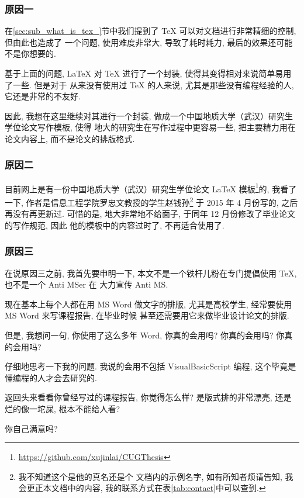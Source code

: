 \documentclass[doctor]{cugthesis}
\begin{document}
\subsubsection{原因一}
    在\ref{sec:sub_what_is_tex_}节中我们提到了 \TeX{} 可以对文档进行非常精细的控制, 但由此也造成了
    一个问题, 使用难度非常大, 导致了耗时耗力, 最后的效果还可能不是你想要的. 

    基于上面的问题, \LaTeX{} 对 \TeX{} 进行了一个封装, 使得其变得相对来说简单易用了一些. 但是对于
    从来没有使用过 \TeX{} 的人来说, 尤其是那些没有编程经验的人, 它还是非常的不友好. 

    因此, 我想在这里继续对其进行一个封装, 做成一个中国地质大学（武汉）研究生学位论文写作模板, 使得
    地大的研究生在写作过程中更容易一些, 把主要精力用在论文内容上, 而不是论文的排版格式. 

\subsubsection{原因二}
    目前网上是有一份中国地质大学（武汉）研究生学位论文 \LaTeX{} 模板\footnote{\url{https://github.com/xujinlai/CUGThesis}}的, 
    我看了一下, 作者是信息工程学院罗忠文教授的学生赵钱孙\footnote{我不知道这个是他的真名还是个
    文档内的示例名字, 如有所知者烦请告知, 我会更正本文档中的内容, 我的联系方式在表\ref{tab:contact}中可以查到. }
    于 2015 年 4 月份写的, 之后再没有再更新过. 可惜的是, 地大非常地不给面子, 于同年 12 月份修改了毕业论文的写作规范, 因此
    他的模板中的内容过时了, 不再适合使用了.
    
\subsubsection{原因三}
    在说原因三之前, 我首先要申明一下, 本文不是一个铁杆儿粉在专门提倡使用 \TeX{}, 也不是一个 Anti MSer 在
    大力宣传 Anti MS. 

    现在基本上每个人都在用 MS Word 做文字的排版, 尤其是高校学生, 经常要使用 MS Word 来写课程报告, 在毕业时候
    甚至还需要用它来做毕业设计论文的排版. 

    但是, 我想问一句, 你使用了这么多年 Word, 你真的会用吗? 你真的会用吗? 你真的会用吗? 

    仔细地思考一下我的问题. 我说的会用不包括 VisualBasicScript 编程, 这个毕竟是懂编程的人才会去研究的.

    返回头来看看你曾经写过的课程报告, 你觉得怎么样? 是版式排的非常漂亮, 还是烂的像一坨屎, 根本不能给人看?

    你自己满意吗?
\end{document}
